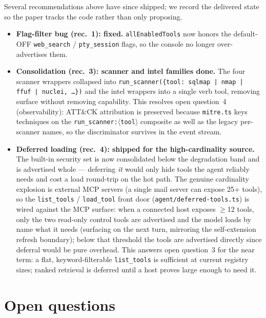 \documentclass[11pt]{article}
\begin{document}
Several recommendations above have since shipped; we record the delivered state
so the paper tracks the code rather than only proposing.

\begin{itemize}[leftmargin=*]
  \item \textbf{Flag-filter bug (rec.~1): fixed.} \texttt{allEnabledTools} now
  honors the default-OFF \texttt{web\_search} / \texttt{pty\_session} flags, so
  the console no longer over-advertises them.
  \item \textbf{Consolidation (rec.~3): scanner and intel families done.} The
  four scanner wrappers collapsed into
  \texttt{run\_scanner(\{tool: sqlmap\,|\,nmap\,|\,ffuf\,|\,nuclei, \ldots\})}
  and the intel wrappers into a single verb tool, removing surface without
  removing capability. This resolves open question~4 (observability): ATT\&CK
  attribution is preserved because \texttt{mitre.ts} keys techniques on the
  \texttt{run\_scanner:$\langle$tool$\rangle$} composite as well as the legacy
  per-scanner names, so the discriminator survives in the event stream.
  \item \textbf{Deferred loading (rec.~4): shipped for the high-cardinality
  source.} The built-in security set is now consolidated below the degradation
  band and is advertised whole --- deferring \emph{it} would only hide tools the
  agent reliably needs and cost a load round-trip on the hot path. The genuine
  cardinality explosion is external MCP servers (a single mail server can expose
  25+ tools), so the \texttt{list\_tools} / \texttt{load\_tool} front door
  (\texttt{agent/deferred-tools.ts}) is wired against the MCP surface: when a
  connected host exposes $\geq$12 tools, only the two read-only control tools are
  advertised and the model loads by name what it needs (surfacing on the next
  turn, mirroring the self-extension refresh boundary); below that threshold the
  tools are advertised directly since deferral would be pure overhead. This
  answers open question~3 for the near term: a flat, keyword-filterable
  \texttt{list\_tools} is sufficient at current registry sizes; ranked retrieval
  is deferred until a host proves large enough to need it.
\end{itemize}

\section{Open questions}
\end{document}
